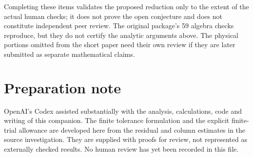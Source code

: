Completing these items validates the proposed reduction only to the extent
of the actual human checks; it does not prove the open conjecture and does
not constitute independent peer review. The original package's 59 algebra
checks reproduce, but they do not certify the analytic arguments above.
The physical portions omitted from the short paper need their own review
if they are later submitted as separate mathematical claims.

\section*{Preparation note}
OpenAI's Codex assisted substantially with the analysis, calculations, code
and writing of this companion. The finite tolerance formulation and the
explicit finite-trial allowance are developed here from the residual and
column estimates in the source investigation. They are supplied with proofs
for review, not represented as externally checked results. No human review
has yet been recorded in this file.
\clearpage


